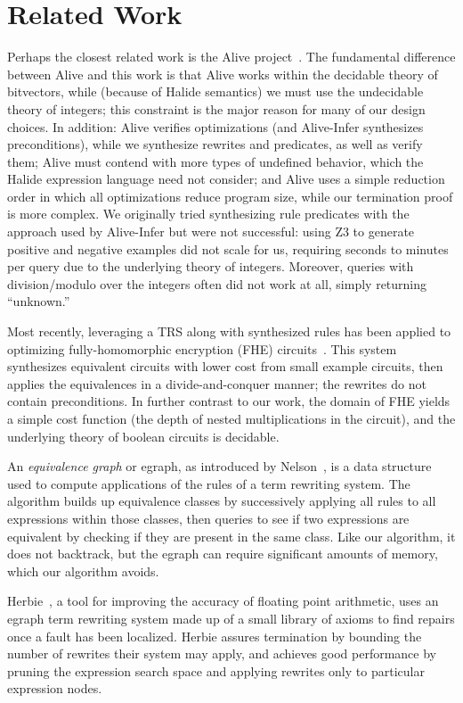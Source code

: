\documentclass[acmsmall,review,anonymous]{acmart}\settopmatter{printfolios=true,printccs=false,printacmref=false}
\begin{document}
\section{Related Work}
Perhaps the closest related work is the Alive project~\cite{lopes2015alive,menendez2017aliveinfer}.
The fundamental difference between Alive and this
work is that Alive works within the decidable theory of bitvectors, while
(because of Halide semantics) we must use the undecidable theory of integers;
this constraint is the major reason for many of our design choices. In addition:
Alive verifies optimizations (and Alive-Infer synthesizes preconditions), while
we synthesize rewrites and predicates, as well as verify them; Alive must contend
with more types of undefined behavior, which the Halide expression
language need not consider; and Alive uses a simple reduction order in
which all optimizations reduce program size, while our termination proof is more
complex. We originally tried synthesizing rule predicates with the approach used
by Alive-Infer but were not successful: using Z3 to generate positive and
negative examples did not scale for us, requiring seconds to minutes per query
due to the underlying theory of integers.  Moreover, queries with
division/modulo over the integers often did not work at all, simply returning
``unknown.''

Most recently, leveraging a TRS along with synthesized rules has been applied
to optimizing fully-homomorphic encryption (FHE) circuits~\cite{lee2020fhe}.  This
system synthesizes equivalent circuits with lower cost from small example circuits,
then applies the equivalences in a divide-and-conquer manner; the rewrites do
not contain preconditions. In further contrast to our work, the domain of FHE yields a
simple cost function (the depth of nested multiplications in the circuit), and
the underlying theory of boolean circuits is decidable.


An \textit{equivalence graph} or egraph, as introduced by Nelson~\cite{nelson1980techniques}, is a data structure used to compute applications of the rules of a term rewriting system. The algorithm builds up equivalence classes by successively applying all rules to all expressions within those classes, then queries to see if two expressions are equivalent by checking if they are present in the same class. Like our algorithm, it does not backtrack, but the egraph can require significant amounts of memory, which our algorithm avoids.

Herbie~\cite{panchekha2015automatically}, a tool for improving the accuracy of floating point arithmetic, uses an egraph term rewriting system made up of a small library of axioms to find repairs once a fault has been localized. Herbie assures termination by bounding the number of rewrites their system may apply, and achieves good performance by pruning the expression search space and applying rewrites only to particular expression nodes. 
\end{document}
